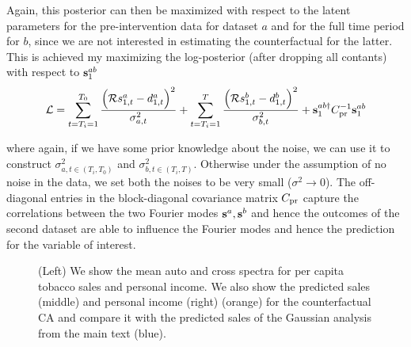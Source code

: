 \documentclass{article}
\def\bs{{\bf s}}
\begin{document}
Again, this posterior can then be maximized with respect to the latent parameters for the pre-intervention data for dataset $a$ and for the full time period for $b$, since we are not interested in estimating the counterfactual for the latter. This is achieved my maximizing the log-posterior (after dropping all contants) with respect to $\bs^{ab}_1$ 
\begin{equation}
    \mathcal{L} = \sum_{t = T_i=1}^{T_0} \frac{ \Big(\mathcal{R}s_{1, t}^a - d^a_{1,t} \Big)^2}{\sigma_{a,t}^2} + 
        \sum_{t = T_i=1}^{T} \frac{ \Big(\mathcal{R}s_{1, t}^b - d^b_{1,t} \Big)^2}{\sigma_{b,t}^2} + \bs_1^{ab \dagger} C_{\rm pr}^{-1}\bs_1^{ab}
    \label{eq:posterior2}
\end{equation}

where again, if we have some prior knowledge about the noise, we can use it to construct $\sigma^2_{a, t \in (T_i, T_0)}$ and $\sigma^2_{b, t \in (T_i, T)}$. Otherwise under the assumption of no noise in the data, we set both the noises to be very small ($\sigma^2 \rightarrow 0$). The off-diagonal entries in the block-diagonal covariance matrix $C_{\rm pr}$ capture the correlations between the two Fourier modes $\bs^a, \bs^b$ and hence the outcomes of the second dataset are able to influence the Fourier modes and hence the prediction for the variable of interest.

\begin{figure}
    \centering
    \caption{(Left) We show the mean auto and cross spectra for per capita tobacco sales and personal income. We also show the predicted sales (middle) and personal income (right) (orange) for the counterfactual CA and compare it with the predicted sales of the Gaussian analysis from the main text (blue).}
\label{fig:2danalysis}
\end{figure}
\end{document}
